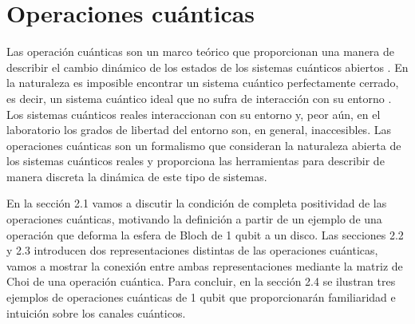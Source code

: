 \chapter{Operaciones cuánticas} %

Las operación cuánticas son un marco teórico que proporcionan
una manera de describir el cambio dinámico de los estados 
de los sistemas cuánticos abiertos \cite{bengtsson_zyczkowski_2017}. 
En la naturaleza es imposible
encontrar un sistema cuántico perfectamente cerrado, es decir, un 
sistema cuántico ideal que no sufra de interacción con su entorno
\cite{nielsen_chuang_2011}. Los sistemas cuánticos reales 
interaccionan con su entorno y, peor aún, en el laboratorio 
los grados de libertad del entorno son, en general, inaccesibles.
Las operaciones cuánticas son un formalismo que consideran
la naturaleza abierta de los sistemas cuánticos reales y proporciona
las herramientas para describir de manera discreta la dinámica
de este tipo de sistemas.

En la sección 2.1 vamos a discutir la condición de completa 
positividad  de las operaciones cuánticas, motivando la definición
a partir de un ejemplo de una operación que deforma la esfera de
Bloch de 1 qubit a un disco. Las secciones 2.2 y 2.3 introducen dos 
representaciones distintas de las operaciones cuánticas,
vamos a mostrar la conexión entre ambas representaciones
mediante la matriz de Choi de una operación cuántica. Para 
concluir, en la sección 2.4 se ilustran tres ejemplos de 
operaciones cuánticas de 1 qubit que proporcionarán familiaridad
e intuición sobre los canales cuánticos. 
